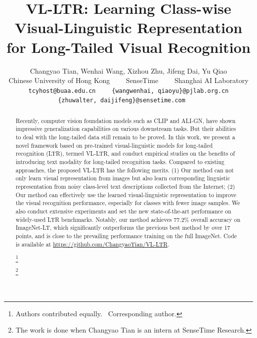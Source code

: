 \documentclass[runningheads]{llncs}
\newcommand\blfootnote[1]{\begingroup
\renewcommand\thefootnote{}\footnote{#1}\addtocounter{footnote}{-1}\endgroup
}
\begin{document}
\pagestyle{headings}
\mainmatter
\def\ECCVSubNumber{4849}  

\title{VL-LTR: Learning Class-wise Visual-Linguistic Representation for Long-Tailed Visual Recognition} 

\begin{comment}
\titlerunning{ECCV-22 submission ID \ECCVSubNumber} 
\authorrunning{ECCV-22 submission ID \ECCVSubNumber} 
\author{Anonymous ECCV submission}
\institute{Paper ID \ECCVSubNumber}
\end{comment}


\author{Changyao Tian, 
    Wenhai Wang,
    Xizhou Zhu,
    Jifeng Dai\textsuperscript{\Letter},
    Yu Qiao \\
    Chinese University of Hong Kong~~~~
    SenseTime~~~~
    Shanghai AI Laboratory
    {\tt\small tcyhost@buaa.edu.cn}~~~~
    {\tt\small \{wangwenhai, qiaoyu\}@pjlab.org.cn}\\
    {\tt\small \{zhuwalter, daijifeng\}@sensetime.com}~~~~
}
\institute{}
\maketitle

\begin{abstract}
Recently, computer vision foundation models such as CLIP and ALI-GN, have shown impressive generalization capabilities on various downstream tasks. But their abilities to deal with the long-tailed data still remain to be proved. In this work, we present a novel framework based on pre-trained visual-linguistic models for long-tailed recognition (LTR), termed VL-LTR, and conduct empirical studies on the benefits of introducing text modality for long-tailed recognition tasks.
Compared to existing approaches, the proposed VL-LTR has the following merits. 
(1) Our method can not only learn visual representation from images but also learn corresponding linguistic representation from noisy class-level text descriptions collected from the Internet; 
(2) Our method can effectively use the learned visual-linguistic representation to improve the visual recognition performance, especially for classes with fewer image samples. We also conduct extensive experiments and set the new state-of-the-art performance on widely-used LTR benchmarks. Notably, our method achieves 77.2\% overall accuracy on ImageNet-LT, which significantly outperforms the previous best method by over 17 points, and is close to the prevailing performance training on the full ImageNet. Code is available at \url{https://github.com/ChangyaoTian/VL-LTR}.

\blfootnote{ Authors contributed equally. \Letter~Corresponding author. }
\blfootnote{ The work is done when Changyao Tian is an intern at SenseTime Research.}
\end{abstract}
\end{document}
